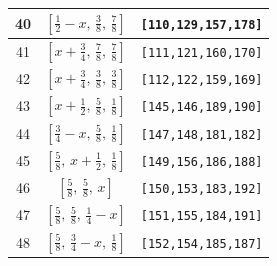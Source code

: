 \documentclass[fleqn,8pt]{jsarticle}
\begin{document}
\begin{longtable}{ccc}
40 & $\left[ \frac{1}{2} - x,\, \frac{3}{8},\, \frac{7}{8} \right]$ & {\tt [110,129,157,178]} \\ \hline
41 & $\left[ x + \frac{3}{4},\, \frac{7}{8},\, \frac{7}{8} \right]$ & {\tt [111,121,160,170]} \\ \hline
42 & $\left[ x + \frac{3}{4},\, \frac{3}{8},\, \frac{3}{8} \right]$ & {\tt [112,122,159,169]} \\ \hline
43 & $\left[ x + \frac{1}{2},\, \frac{5}{8},\, \frac{1}{8} \right]$ & {\tt [145,146,189,190]} \\ \hline
44 & $\left[ \frac{3}{4} - x,\, \frac{5}{8},\, \frac{1}{8} \right]$ & {\tt [147,148,181,182]} \\ \hline
45 & $\left[ \frac{5}{8},\, x + \frac{1}{2},\, \frac{1}{8} \right]$ & {\tt [149,156,186,188]} \\ \hline
46 & $\left[ \frac{5}{8},\, \frac{5}{8},\, x \right]$ & {\tt [150,153,183,192]} \\ \hline
47 & $\left[ \frac{5}{8},\, \frac{5}{8},\, \frac{1}{4} - x \right]$ & {\tt [151,155,184,191]} \\ \hline
48 & $\left[ \frac{5}{8},\, \frac{3}{4} - x,\, \frac{1}{8} \right]$ & {\tt [152,154,185,187]} \\
\end{longtable}
\renewcommand{\arraystretch}{1.2}
\end{document}
